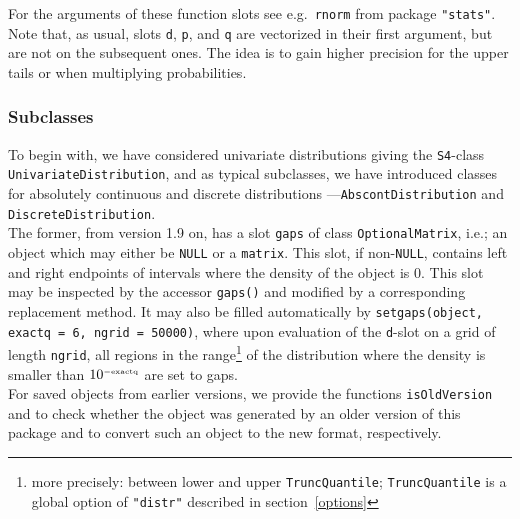 \documentclass[11pt]{article}
\newcommand{\code}[1]{{\tt #1}}
\newcommand{\pkg}[1]{{\tt "#1"}}
\begin{document}
For the arguments of these function slots see e.g.\ \code{rnorm}
from package \pkg{stats}.
Note that, as usual, slots \code{d}, \code{p}, and \code{q} are vectorized
in their first argument, but are not on the subsequent ones.
The idea is to gain higher precision for the upper tails or when multiplying
probabilities.
\subsubsection{Subclasses}
To begin with, we have considered univariate distributions giving the
{\tt S4}-class \code{UnivariateDistribution}, and as typical subclasses, we
have introduced classes for absolutely continuous and discrete distributions
---\code{AbscontDistribution} and \code{DiscreteDistribution}.\\

The former, from version 1.9 on, has a slot \code{gaps} of class
\code{OptionalMatrix}, i.e.; an object which may either be \code{NULL} or
a \code{matrix}. This slot, if non-\code{NULL}, contains left and right
endpoints of intervals where the density of the object is $0$. This slot
may be inspected by the accessor \code{gaps()} and modified by a corresponding
replacement method. It may also be filled automatically by
\code{setgaps(object, exactq = 6, ngrid = 50000)}, where upon evaluation of
the \code{d}-slot on a grid of length \code{ngrid}, all regions in the
range\footnote{more precisely: between lower and upper \code{TruncQuantile};
 \code{TruncQuantile} is a global option of  \pkg{distr} described in
 section~\ref{options}} of the distribution where the density is smaller than
 $10^{\scriptscriptstyle - {\rm exactq}}$ are set to gaps.\\ For saved objects
 from earlier versions, we provide the functions \code{isOldVersion} and
 \linebreak[4]\code{conv2NewVersion} to check whether the
object was generated by an older version of this package and
to convert such an object to the new format, respectively.\\
\end{document}
